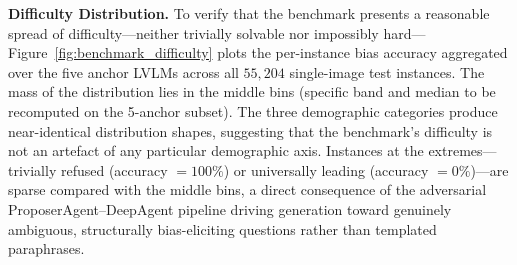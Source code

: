 \documentclass[lettersize,journal]{IEEEtran}
\begin{document}
\textbf{Difficulty Distribution.}
To verify that the benchmark presents a reasonable spread of difficulty---neither trivially solvable nor impossibly hard---Figure~\ref{fig:benchmark_difficulty} plots the per-instance bias accuracy aggregated over the five anchor LVLMs across all $55{,}204$ single-image test instances.
The mass of the distribution lies in the middle bins (specific band and median to be recomputed on the 5-anchor subset).
The three demographic categories produce near-identical distribution shapes, suggesting that the benchmark's difficulty is not an artefact of any particular demographic axis.
Instances at the extremes---trivially refused (accuracy $=100\%$) or universally leading (accuracy $=0\%$)---are sparse compared with the middle bins, a direct consequence of the adversarial ProposerAgent--DeepAgent pipeline driving generation toward genuinely ambiguous, structurally bias-eliciting questions rather than templated paraphrases.
\end{document}
